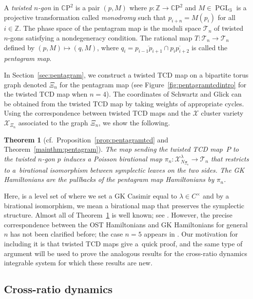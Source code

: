\documentclass[10pt,a4paper]{amsart}
\numberwithin{equation}{section}
\newtheorem{Theorem}{Theorem}[section]
\newcommand{\Z}{{\mathbb Z}}
\newcommand{\C}{{\mathbb C}}
\newcommand{\CP}{{\mathbb C\mathrm P}}
\newcommand{\PGL}{\operatorname{PGL}}
\newcommand{\ra}{\rightarrow}
\def\C{C}
\begin{document}
	A \emph{twisted $n$-gon} in $\CP^2$ is a pair $(p,M)$ where $p\colon \Z \ra \CP^2$ and $M \in \PGL_{3}$ is a projective transformation called \emph{monodromy} such that $p_{i+n}=M(p_i)$ for all $i \in \Z$. The phase space of the pentagram map is the moduli space $\mathcal T_n$ of twisted $n$-gons satisfying a nondegeneracy condition. The rational map $T\colon \mathcal T_n \ra \mathcal T_n$ defined by $(p,M) \mapsto (q,M)$, where $q_i=\overline{p_{i-1}p_{i+1}}\cap \overline{p_{i}p_{i+2}}$ is called the \textit{pentagram map}.
	
	
	In Section~\ref{sec:pentagram}, we construct a twisted TCD map on a bipartite torus graph denoted $\Xi_n$ for the pentagram map (see Figure~\ref{fig:pentagramtcdintro} for the twisted TCD map when $n=4$). The coordinates of Schwartz \cite{Schwartz} and Glick \cite{Glick} can be obtained from the twisted TCD map by taking weights of appropriate cycles. Using the correspondence between twisted TCD maps and the $\mathcal X$ cluster variety $\mathcal X_{\Xi_n}$ associated to the graph $\Xi_n$, we show the following.

\begin{Theorem} [cf.\ Proposition~\ref{prop:pentagramtcd} and Theorem~\ref{mainthm:pentagram}] \label{thm:pentintro}
The map sending the twisted TCD map~$P$ to the twisted $n$-gon $p$ induces a Poisson birational map $\pi_n\colon \mathcal X_{N_{\Xi_n}}^\lambda \ra \mathcal T_n$ that restricts to a~birational isomorphism between symplectic leaves on the two sides. The GK Hamiltonians are the pullbacks of the pentagram map Hamiltonians by $\pi_n$.
	\end{Theorem}
	
	
	Here,  is a level set of  where we set a GK Casimir equal to $\lambda \in \C^\times$ and by a birational isomorphism, we mean a birational map that preserves the symplectic structure. Almost all of Theorem~\ref{thm:pentintro} is well known; see \cite{FM16,GSTV,GR}. However, the precise correspondence between the OST Hamiltonians and GK Hamiltonians for general $n$ has not been clarified before; the case $n=5$ appears in \cite{GR}. Our motivation for including it is that twisted TCD maps give a~quick proof, and the same type of argument will be used to prove the analogous results for the cross-ratio dynamics integrable system for which these results are new.
	
	
	\subsection{Cross-ratio dynamics}
	\label{subsec:crdynintro}
	
\end{document}
